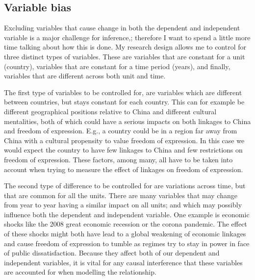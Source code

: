 \subsection{Variable bias}
Excluding variables that cause change in both the dependent and independent variable is a major challenge for inference,; therefore I want to spend a little more time talking about how this is done. My research design allows me to control for three distinct types of variables. These are variables that are constant for a unit (country), variables that are constant for a time period (years), and finally, variables that are different across both unit and time. 

The first type of variables to be controlled for, are variables which are different between countries, but stays constant for each country. This can for example be different geographical positions relative to China and different cultural mentalities, both of which could have a serious impacts on both linkages to China and freedom of expression. E.g., a country could be in a region far away from China with a cultural propensity to value freedom of expression. In this case we would expect the country to have few linkages to China and few restrictions on freedom of expression. These factors, among many, all have to be taken into account when trying to measure the effect of linkages on freedom of expression. 

The second type of difference to be controlled for are variations across time, but that are common for all the units. There are many variables that may change from year to year having a similar impact on all units; and which may possibly influence both the dependent and independent variable. One example is economic shocks like the 2008 great economic recession or the corona pandemic. The effect of these shocks might both have lead to a global weakening of economic linkages and cause freedom of expression to tumble as regimes try to stay in power in face of public dissatisfaction. Because they affect both of our dependent and independent variables, it is vital for any causal interference that these variables are accounted for when modelling the relationship.

